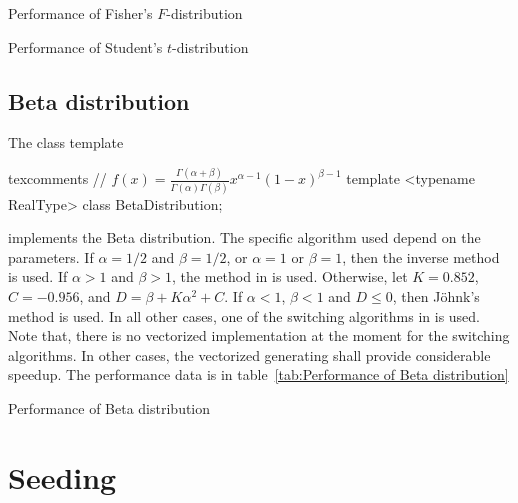 \begin{table}
  
  \caption{Performance of Fisher's $F$-distribution}
  \label{tab:Performance of Fisher's F-distribution}
\end{table}

\begin{table}
  
  \caption{Performance of Student's $t$-distribution}
  \label{tab:Performance of Student's t-distribution}
\end{table}

\subsection{Beta distribution}
\label{sub:Beta distribution}

The class template
\begin{cppcode*}{texcomments}
  // $f(x) = \frac{\Gamma(\alpha + \beta)}{\Gamma(\alpha)\Gamma(\beta)}x^{\alpha - 1}(1 - x)^{\beta - 1}$
  template <typename RealType>
  class BetaDistribution;
\end{cppcode*}
implements the Beta distribution. The specific algorithm used depend on the
parameters. If $\alpha = 1/2$ and $\beta = 1/2$, or $\alpha = 1$ or $\beta =
1$, then the inverse method is used. If $\alpha > 1$ and $\beta > 1$, the
method in \textcite{Cheng:1978jl} is used. Otherwise, let $K = 0.852$, $C =
-0.956$, and $D = \beta + K\alpha^2 + C$. If $\alpha < 1$, $\beta < 1$ and $D
\le 0$, then Jöhnk's method \parencite[sec.~3.5]{Devroye:1986gi} is used. In
all other cases, one of the switching algorithms in \textcite{Atkinson:1979es}
is used. Note that, there is no vectorized implementation at the moment for the
switching algorithms. In other cases, the vectorized generating shall provide
considerable speedup. The performance data is in table~\ref{tab:Performance of
  Beta distribution}

\begin{table}
  
  \caption{Performance of Beta distribution}
  \label{tab:Performance of Beta distribution}
\end{table}

\section{Seeding}
\label{sec:Seeding}

